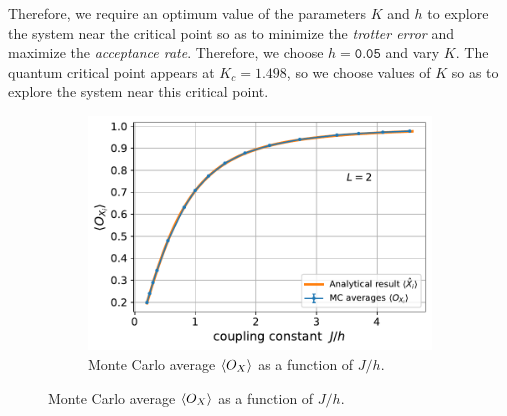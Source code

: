\documentclass[../journal_main.tex]{subfiles}
\begin{document}
Therefore, we require an optimum value of the parameters $K$ and $h$ to explore the system near the critical point so as to minimize the \textit{trotter error} and maximize the \textit{acceptance rate}. Therefore, we choose $h = \texttt{0.05}$ and vary $K$. The quantum critical point appears at $K_c = 1.498$, so we choose values of $K$ so as to explore the system near this critical point.    

\begin{figure}[!htb]
    \centering
    \begin{subfigure}[b]{0.6\textwidth}
        \centering
        \includegraphics[width=\textwidth]{images/2_site/O_X.pdf}
        \caption{Monte Carlo average $\expval{O_X}$ as a function of $J/h$.}
        \label{expval_O_X_vs_J/h_2}
    \end{subfigure}
\end{figure}
\end{document}
